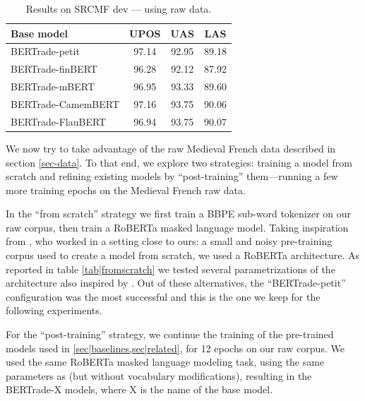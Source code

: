 \begin{table}[tbh]
    \centering
    \tablefontsize
    \begin{tabular}{l*{3}{S[table-format=2.2]}}
        \toprule
        {\textbf{Base model}} & {\textbf{UPOS}} & {\textbf{UAS}} & {\textbf{LAS}} \\
        \midrule
        BERTrade-petit        & 97.14           & 92.95          & 89.18          \\
        \midrule
        BERTrade-finBERT      & 96.28           & 92.12          & 87.92          \\
        BERTrade-mBERT        & 96.95           & 93.33          & 89.60          \\
        BERTrade-CamemBERT    & 97.16           & 93.75          & 90.06          \\
        BERTrade-FlauBERT     & 96.94           & 93.75          & 90.07          \\
        \bottomrule
    \end{tabular}
    \caption{Results on SRCMF dev — using raw data.}\label{tab|post-train}
\end{table}

We now try to take advantage of the raw Medieval French data described in section \ref{sec-data}.
To that end, we explore two strategies: training a model from scratch and refining existing models by \enquote{post-training} them---running a few more training epochs on the Medieval French raw data.

In the \enquote{from scratch} strategy we first train a BBPE sub-word tokenizer \citep{wang2020NeuralMachineTranslation}
on our raw corpus, then train a RoBERTa \citep{liu-etal-2019-roberta} masked language model.
Taking inspiration from \citet{micheli-etal-2020-importance}, who worked in a setting close to ours: a small and noisy pre-training corpus used to create a model from scratch, we used a RoBERTa architecture.
As reported in table \cref{tab|fromscratch} we tested several parametrizations of the architecture
also inspired by \citet{turc-etal-2019-well}.
Out of these alternatives, the \enquote{BERTrade-petit} configuration was the
most successful and this is the one we keep for the following experiments.

For the \enquote{post-training} strategy, we continue the training of the pre-trained models used in \cref{sec|baselines,sec|related}, for \num{12} epochs on our raw corpus. We used the same RoBERTa masked language modeling task, using the same parameters as \citet{wang-etal-2020-extending} (but without vocabulary modifications), resulting in the BERTrade-X models, where X is the name of the base model.

